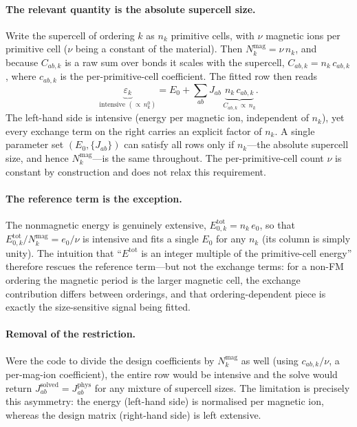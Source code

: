 \documentclass[11pt]{article}
\begin{document}
\paragraph{The relevant quantity is the absolute supercell size.}
Write the supercell of ordering $k$ as $n_k$ primitive cells, with $\nu$ magnetic
ions per primitive cell ($\nu$ being a constant of the material). Then
$N_k^{\mathrm{mag}} = \nu\, n_k$, and because $C_{ab,k}$ is a raw sum over bonds it
scales with the supercell, $C_{ab,k} = n_k\, c_{ab,k}$, where $c_{ab,k}$ is the
per-primitive-cell coefficient. The fitted row then reads
\begin{equation}
  \underbrace{\varepsilon_k}_{\text{intensive }(\propto\, n_k^0)}
  = E_0 + \sum_{ab} J_{ab}\,\underbrace{n_k\, c_{ab,k}}_{C_{ab,k}\,\propto\, n_k} .
\end{equation}
The left-hand side is intensive (energy per magnetic ion, independent of $n_k$),
yet every exchange term on the right carries an explicit factor of $n_k$. A single
parameter set $(E_0, \{J_{ab}\})$ can satisfy all rows only if $n_k$---the
absolute supercell size, and hence $N_k^{\mathrm{mag}}$---is the same throughout.
The per-primitive-cell count $\nu$ is constant by construction and does not relax
this requirement.

\paragraph{The reference term is the exception.} The nonmagnetic energy is
genuinely extensive, $E_{0,k}^{\mathrm{tot}} = n_k\, e_0$, so that
$E_{0,k}^{\mathrm{tot}}/N_k^{\mathrm{mag}} = e_0/\nu$ is intensive and fits a
single $E_0$ for any $n_k$ (its column is simply unity). The intuition that
``$E^{\mathrm{tot}}$ is an integer multiple of the primitive-cell energy''
therefore rescues the reference term---but not the exchange terms: for a non-FM
ordering the magnetic period is the larger magnetic cell, the exchange
contribution differs between orderings, and that ordering-dependent piece is
exactly the size-sensitive signal being fitted.

\paragraph{Removal of the restriction.} Were the code to divide the design
coefficients by $N_k^{\mathrm{mag}}$ as well (using $c_{ab,k}/\nu$, a per-mag-ion
coefficient), the entire row would be intensive and the solve would return
$J_{ab}^{\mathrm{solved}} = J_{ab}^{\mathrm{phys}}$ for any mixture of supercell
sizes. The limitation is precisely this asymmetry: the energy (left-hand side) is
normalised per magnetic ion, whereas the design matrix (right-hand side) is left
extensive.
\end{document}

